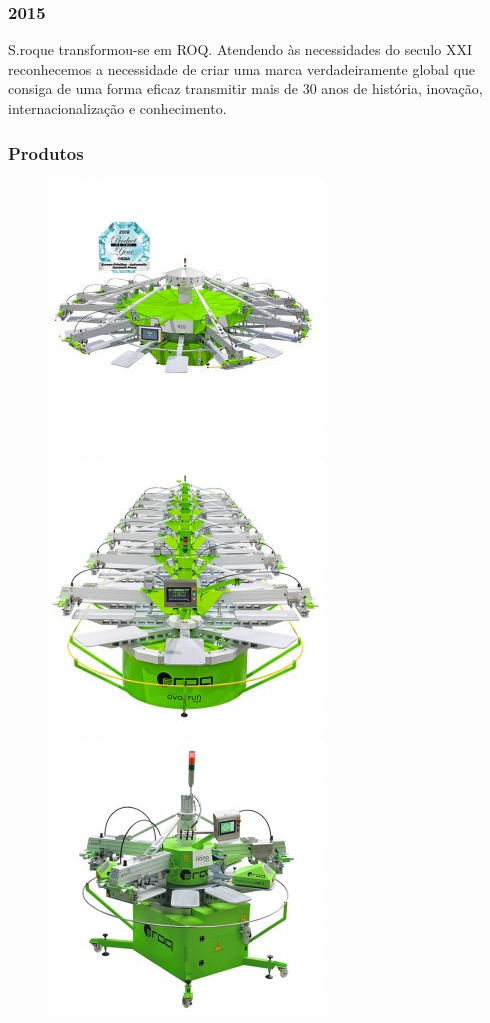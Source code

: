 \begin{frame}
\frametitle{2015}
S.roque transformou-se em ROQ. Atendendo às necessidades do seculo XXI reconhecemos a necessidade de criar uma marca verdadeiramente global que consiga de uma forma eficaz transmitir mais de 30 anos de história, inovação, internacionalização e conhecimento.
\end{frame}
\begin{frame}
\frametitle{Produtos}
\begin{figure}[ht]
\begin{center}
\includegraphics[scale=0.2]{"./image/ROQ/maquinas/ECO-P18_600x600-2-275x275.jpg"}
\includegraphics[scale=0.2]{"./image/ROQ/maquinas/EVO-600x600-275x275.jpg"}
\includegraphics[scale=0.2]{"./image/ROQ/maquinas/nanop10-275x275.jpg"}

\end{center}
\end{figure}
\end{frame}
